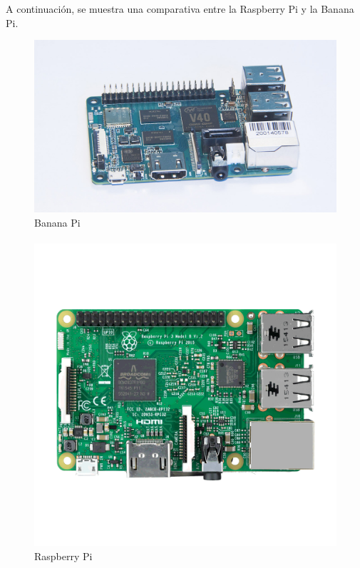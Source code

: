 A continuación, se muestra una comparativa entre la Raspberry Pi y la Banana Pi.

\begin{figure}[H]
	\centering
	\includegraphics[scale=.8]{Capitulo2/images/bananaPi.jpg}
	\caption{Banana Pi}
	\label{fig:diagrama_dispMonitoreo}
\end{figure}

\paragraph{}
\begin{figure}[H]
	\centering
	\includegraphics[scale=.26]{Capitulo2/images/raspberry.png}
	\caption{Raspberry Pi}
	\label{fig:diagrama_dispMonitoreo}
\end{figure}

